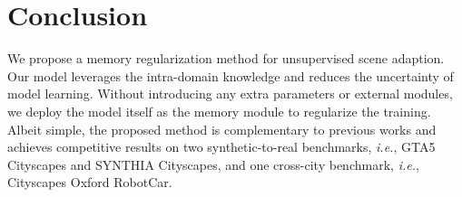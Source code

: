 \documentclass{article}
\def\ie{\emph{i.e.}}
\begin{document}
\begin{table} [!t]
\centering
	\vspace{-2.5mm}
	\caption{
		Quantitative results on the cross-city benchmark: Cityscapes  Oxford RobotCar.
	}
		\label{table:oxford}
\end{table}

\section{Conclusion}
We propose a memory regularization method for unsupervised scene adaption. Our model leverages the intra-domain knowledge and reduces the uncertainty of model learning. Without introducing any extra parameters or external modules, we deploy the model itself as the memory module to regularize the training. Albeit simple, the proposed method is complementary to previous works and achieves competitive results on two synthetic-to-real benchmarks, \ie, GTA5  Cityscapes and SYNTHIA  Cityscapes, and one cross-city benchmark, \ie, Cityscapes  Oxford RobotCar. 

{\footnotesize


}
\end{document}
